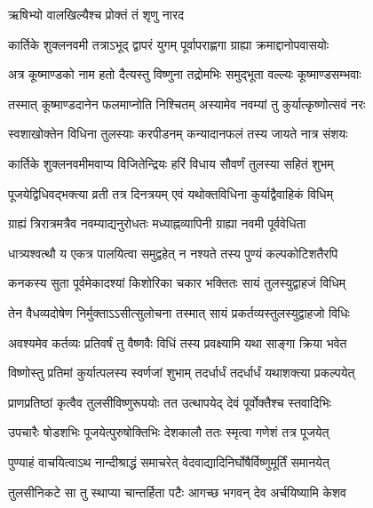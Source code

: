 \onelineshloka
{ऋषिभ्यो वालखिल्यैश्च प्रोक्तं तं शृणु नारद} %





\twolineshloka
{कार्तिके शुक्लनवमी तत्राऽभूद् द्वापरं युगम्}
{पूर्वापराह्णगा ग्राह्या क्रमाद्दानोपवासयोः} %

\twolineshloka
{अत्र कूष्माण्डको नाम हतो दैत्यस्तु विष्णुना}
{तद्रोमभिः समुद्भूता वल्ल्यः कूष्माण्डसम्भवाः} %

\twolineshloka
{तस्मात् कूष्माण्डदानेन फलमाप्नोति निश्चितम्}
{अस्यामेव नवम्यां तु कुर्यात्कृष्णोत्सवं नरः} %

\twolineshloka
{स्वशाखोक्तेन विधिना तुलस्याः करपीडनम्}
{कन्यादानफलं तस्य जायते नात्र संशयः} %

\twolineshloka
{कार्तिके शुक्लनवमीमवाप्य विजितेन्द्रियः}
{हरिं विधाय सौवर्णं तुलस्या सहितं शुभम्} %

\twolineshloka
{पूजयेद्विधिवद्भक्त्या व्रती तत्र दिनत्रयम्}
{एवं यथोक्तविधिना कुर्याद्वैवाहिकं विधिम्} %

\twolineshloka
{ग्राह्यं त्रिरात्रमत्रैव नवम्याद्यनुरोधतः}
{मध्याह्नव्यापिनी ग्राह्या नवमी पूर्ववेधिता} %

\twolineshloka
{धात्र्यश्वत्थौ य एकत्र पालयित्वा समुद्वहेत्}
{न नश्यते तस्य पुण्यं कल्पकोटिशतैरपि} %

\twolineshloka
{कनकस्य सुता पूर्वमेकादश्यां किशोरिका}
{चकार भक्तितः सायं तुलस्युद्वाहजं विधिम्} %

\twolineshloka
{तेन वैधव्यदोषेण निर्मुक्ताऽऽसीत्सुलोचना}
{तस्मात् सायं प्रकर्तव्यस्तुलस्युद्वाहजो विधिः} %

\twolineshloka
{अवश्यमेव कर्तव्यः प्रतिवर्षं तु वैष्णवैः}
{विधिं तस्य प्रवक्ष्यामि यथा साङ्गा क्रिया भवेत} %

\twolineshloka
{विष्णोस्तु प्रतिमां कुर्यात्पलस्य स्वर्णजां शुभाम्}
{तदर्धार्धं तदर्धार्धं यथाशक्त्या प्रकल्पयेत्} %

\twolineshloka
{प्राणप्रतिष्ठां कृत्वैव तुलसीविष्णुरूपयोः}
{तत उत्थापयेद् देवं पूर्वोक्तैश्च स्तवादिभिः} %

\twolineshloka
{उपचारैः षोडशभिः पूजयेत्पुरुषोक्तिभिः}
{देशकालौ ततः स्मृत्वा गणेशं तत्र पूजयेत्} %

\twolineshloka
{पुण्याहं वाचयित्वाऽथ नान्दीश्राद्धं समाचरेत्}
{वेदवाद्यादिनिर्घोषैर्विष्णुमूर्तिं समानयेत्} %

\twolineshloka
{तुलसीनिकटे सा तु स्थाप्या चान्तर्हिता पटैः}
{आगच्छ भगवन् देव अर्चयिष्यामि केशव} %

